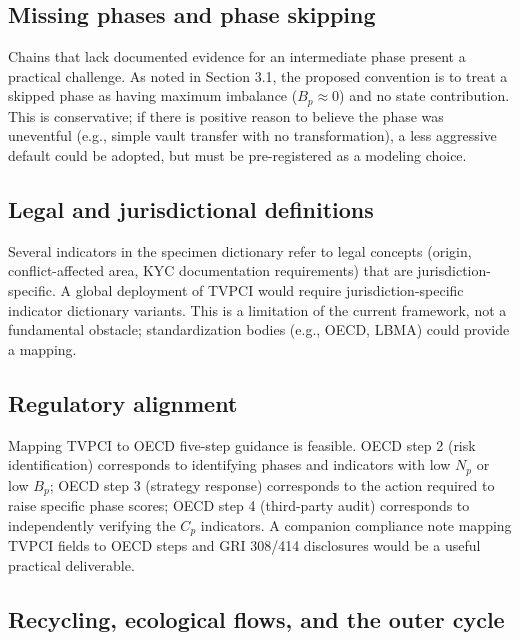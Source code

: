 \documentclass[12pt]{article}
\begin{document}
\subsection{Missing phases and phase skipping}\label{missing-phases-and-phase-skipping}

Chains that lack documented evidence for an intermediate phase present a
practical challenge. As noted in Section 3.1, the proposed convention is
to treat a skipped phase as having maximum imbalance (\(B_p \approx 0\))
and no state contribution. This is conservative; if there is positive
reason to believe the phase was uneventful (e.g., simple vault transfer
with no transformation), a less aggressive default could be adopted, but
must be pre-registered as a modeling choice.

\subsection{Legal and jurisdictional definitions}\label{legal-and-jurisdictional-definitions}

Several indicators in the specimen dictionary refer to legal concepts
(origin, conflict-affected area, KYC documentation requirements) that
are jurisdiction-specific. A global deployment of TVPCI would require
jurisdiction-specific indicator dictionary variants. This is a
limitation of the current framework, not a fundamental obstacle;
standardization bodies (e.g., OECD, LBMA) could provide a mapping.

\subsection{Regulatory alignment}\label{regulatory-alignment}

Mapping TVPCI to OECD five-step guidance is feasible. OECD step 2 (risk
identification) corresponds to identifying phases and indicators with
low \(N_p\) or low \(B_p\); OECD step 3 (strategy response) corresponds
to the action required to raise specific phase scores; OECD step 4
(third-party audit) corresponds to independently verifying the \(C_p\)
indicators. A companion compliance note mapping TVPCI fields to OECD
steps and GRI 308/414 disclosures would be a useful practical
deliverable.

\subsection{Recycling, ecological flows, and the outer cycle}\label{recycling-ecological-flows-and-the-outer-cycle}
\end{document}
